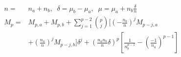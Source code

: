 \Crunch
\begin{small}
\begin{displaymath}
\begin{split}
n=& n_a+n_b, \;\; \delta=\mu_b-\mu_a, \;\; \mu=\mu_a+n_b\frac{\delta}{n} \\
M_p =& M_{p,a}+M_{p,b}+\sum\limits_{j=1}^{p-2}{p \choose j} [(-\frac{n_b}{n})^j M_{p-j,a} \\
  & + (\frac{n_a}{n})^j M_{p-j,b}]\delta^j + (\frac{n_an_b}{n}\delta)^p[\frac{1}{n_b^{p-1}}-(\frac{-1}{n_a})^{p-1}]
\end{split}
\label{eq:cmeq}
\end{displaymath}
\end{small}
\Crunch


%


